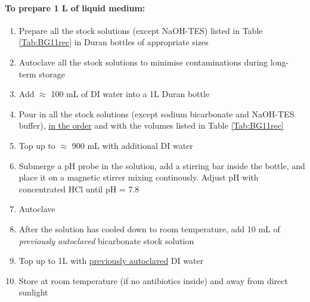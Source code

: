 \documentclass[12pt]{article}
\begin{document}
    \paragraph{To prepare 1 L of liquid medium:}
    \begin{enumerate}
        \item Prepare all the stock solutions (except NaOH-TES) listed in Table \ref{Tab:BG11rec} in Duran bottles of appropriate sizes
        \item Autoclave all the stock solutions to minimise contaminations during long-term storage
        \item Add $\approx$ 100 mL of DI water into a 1L Duran bottle
        \item Pour in all the stock solutions (except sodium bicarbonate and NaOH-TES buffer), \underline{in the order} and with the volumes listed in Table \ref{Tab:BG11rec}
        \item Top up to $\approx$ 900 mL with additional DI water
        \item Submerge a pH probe in the solution, add a stirring bar inside the bottle, and place it on a magnetic stirrer mixing continously. Adjust pH with concentrated HCl until pH = 7.8
        \item Autoclave 
        \item After the solution has cooled down to room temperature, add 10 mL of \textit{previously autoclaved} bicarbonate stock solution
        \item Top up to 1L with \underline{previously autoclaved} DI water
        \item Store at room temperature (if no antibiotics inside) and away from direct sunlight
    \end{enumerate} 
    
\end{document}
